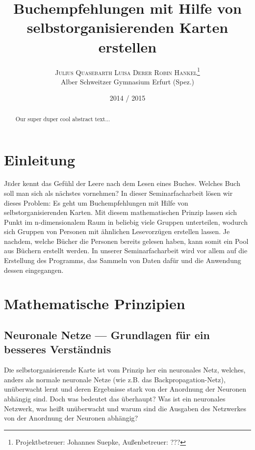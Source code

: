 \documentclass[twoside,a4paper,draft]{article}
\title{\vspace{-15mm}\fontsize{24pt}{10pt}\selectfont\bfseries{}Buchempfehlungen mit Hilfe von selbstorganisierenden Karten erstellen}
\author{\large\textsc{Julius Quasebarth \quad Luisa Derer \quad Robin Hankel}\thanks{Projektbetreuer: Johannes Suepke, Außenbetreuer: ???}\\[2mm]\normalsize Alber Schweitzer Gymnasium Erfurt (Spez.)\\\vspace{-5mm}}
\date{2014 / 2015}
\newcommand{\commonlettrine}[1]{\lettrine[nindent=0em,lines=2]{#1}}
\begin{document}
\maketitle

\thispagestyle{fancy}


\begin{otherlanguage}{english}
\begin{abstract}
\noindent
Our super duper cool abstract text...
\end{abstract}
\end{otherlanguage}

\tableofcontents

\begin{multicols}{2}

\section{Einleitung}

\commonlettrine{J}eder kennt das Gefühl der Leere nach dem Lesen eines Buches. Welches Buch soll man sich als nächstes vornehmen? In dieser Seminarfacharbeit lösen wir dieses Problem: Es geht um Buchempfehlungen mit Hilfe von selbstorganisierenden Karten. Mit diesem mathematischen Prinzip lassen sich Punkt im n-dimensionalem Raum in beliebig viele Gruppen unterteilen, wodurch sich Gruppen von Personen mit ähnlichen Lesevorzügen erstellen lassen. Je nachdem, welche Bücher die Personen bereits gelesen haben, kann somit ein \glqq{}Pool\grqq{} aus Büchern erstellt werden. In unserer Seminarfacharbeit wird vor allem auf die Erstellung des Programms, das Sammeln von Daten dafür und die Anwendung dessen eingegangen.

\section{Mathematische Prinzipien}
\subsection{Neuronale Netze --- Grundlagen für ein besseres Verständnis}

\commonlettrine{D}ie selbstorganisierende Karte ist vom Prinzip her ein neuronales Netz, welches, anders als \glqq{}normale\grqq{} neuronale Netze (wie z.B. das Backpropagation-Netz), unüberwacht lernt und deren Ergebnisse stark von der Anordnung der Neuronen abhängig sind. Doch was bedeutet das überhaupt? Was ist ein neuronales Netzwerk, was heißt \glqq{}unüberwacht\grqq{} und warum sind die Ausgaben des Netzwerkes von der Anordnung der Neuronen abhängig?


\end{multicols}
\end{document}
